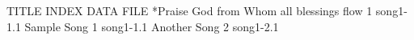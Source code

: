 TITLE INDEX DATA FILE
*Praise God from Whom all blessings flow
1
song1-1.1
Sample Song
1
song1-1.1
Another Song
2
song1-2.1
